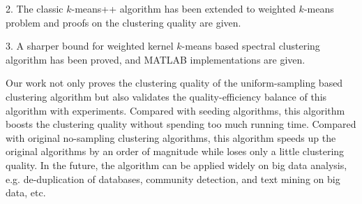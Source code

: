 \begin{englishabstract}
2. The classic $k$-means++ algorithm has been extended to weighted $k$-means problem and proofs on the clustering quality are given.

3. A sharper bound for weighted kernel $k$-means based spectral clustering algorithm has been proved, and MATLAB implementations are given.

Our work not only proves the clustering quality of the uniform-sampling based clustering algorithm but also validates the quality-efficiency balance of this algorithm with experiments. Compared with seeding algorithms, this algorithm boosts the clustering quality without spending too much running time. Compared with original no-sampling clustering algorithms, this algorithm speeds up the original algorithms by an order of magnitude while loses only a little clustering quality. In the future, the algorithm can be applied widely on big data analysis, e.g. de-duplication of databases, community detection, and text mining on big data, etc.

\end{englishabstract}


